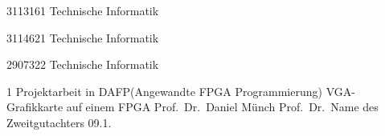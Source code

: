 \documentclass[12pt,a4paper,bibliography=totoc,listof=totoc]{scrartcl}
\begin{document}
{3113161}						%
{Technische Informatik}			%

{3114621}						%
{Technische Informatik}			%

{2907322}						%
{Technische Informatik}			%


\MyTitelseite{}
{1}								%
{Projektarbeit in DAFP(Angewandte FPGA Programmierung)}			%
{VGA-Grafikkarte auf einem FPGA}				%
{Prof.\ Dr.\ Daniel Münch}   %
{Prof.\ Dr.\ Name des Zweitgutachters}	%
{09.1.\the\year}				%

\setcounter{page}{1} 




\tableofcontents
\pagebreak
\end{document}
